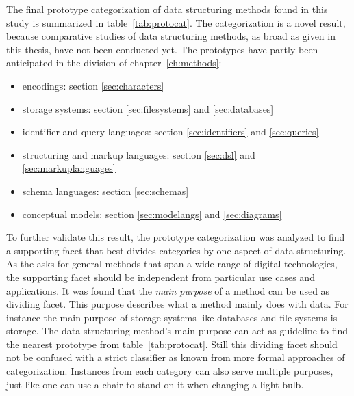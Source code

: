 The final prototype categorization of data structuring methods found in this
study is summarized in table~\ref{tab:protocat}. The categorization is a novel
result, because comparative studies of data structuring methods, as broad as
given in this thesis, have not been conducted yet. The prototypes have partly
been anticipated in the division of chapter~\ref{ch:methods}:

\begin{itemize}
 \item encodings: section 
  \ref{sec:characters}
 \item storage systems: section 
  \ref{sec:filesystems} and \ref{sec:databases}
 \item identifier and query languages: section
   \ref{sec:identifiers} and \ref{sec:queries}
 \item structuring and markup languages: section
  \ref{sec:dsl} and \ref{sec:markuplanguages}
 \item schema languages: 
   section \ref{sec:schemas}
 \item conceptual models:
   section \ref{sec:modelangs} and \ref{sec:diagrams}
\end{itemize}

To further validate this result, the prototype categorization was analyzed to
find a supporting facet that best divides categories by one aspect of data
structuring. As the  asks for general methods that
span a wide range of digital technologies, the supporting facet should be
independent from particular use cases and applications. It was found that the
{\em main purpose} of a method can be used as dividing facet. This purpose
describes what a method mainly does with data. For instance the main purpose of
storage systems like databases and file systems is storage.  The data
structuring method's main purpose can act as guideline to find the nearest
prototype from table~\ref{tab:protocat}. Still this dividing facet should not
be confused with a strict classifier as known from more formal approaches of
categorization. Instances from each category can also serve multiple purposes,
just like one can use a chair to stand on it when changing a light bulb.


